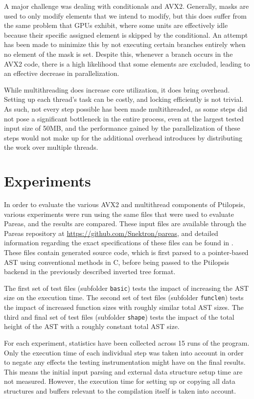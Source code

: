 \documentclass[11pt,dvipsnames]{article}
\newcommand{\mono}[1]{\texttt{#1}}
\newcommand{\Rplus}{\protect\hspace{-.1em}\protect\raisebox{.35ex}{\smaller{\smaller\textbf{+}}}}
\newcommand{\Cpp}{\mbox{C\Rplus\Rplus}\xspace}
\begin{document}
A major challenge was dealing with conditionals and AVX2. Generally, masks are used to only modify elements that we intend to modify, but this does suffer from the same problem that GPUs exhibit, where some units are effectively idle because their specific assigned element is skipped by the conditional. An attempt has been made to minimize this by not executing certain branches entirely when no element of the mask is set. Despite this, whenever a branch occurs in the AVX2 code, there is a high likelihood that some elements are excluded, leading to an effective decrease in parallelization.

While multithreading does increase core utilization, it does bring overhead. Setting up each thread's task can be costly, and locking efficiently is not trivial. As such, not every step possible has been made multithreaded, as some steps did not pose a significant bottleneck in the entire process, even at the largest tested input size of 50MB, and the performance gained by the parallelization of these steps would not make up for the additional overhead introduces by distributing the work over multiple threads.

\section{Experiments} \label{experiments}

In order to evaluate the various AVX2 and multithread components of Ptilopsis, various experiments were run using the same files that were used to evaluate Pareas, and the results are compared. These input files are available through the Pareas repository at \url{https://github.com/Snektron/pareas}, and detailed information regarding the exact specifications of these files can be found in \cite{huijben2021}. These files contain generated source code, which is first parsed to a pointer-based AST using conventional methods in \Cpp, before being passed to the Ptilopsis backend in the previously described inverted tree format.

The first set of test files (subfolder \mono{basic}) tests the impact of increasing the AST size on the execution time. The second set of test files (subfolder \mono{funclen}) tests the impact of increased function sizes with roughly similar total AST sizes. The third and final set of test files (subfolder \mono{shape}) tests the impact of the total height of the AST with a roughly constant total AST size.

For each experiment, statistics have been collected across 15 runs of the program. Only the execution time of each individual step was taken into account in order to negate any effects the testing instrumentation might have on the final results. This means the initial input parsing and external data structure setup time are not measured. However, the execution time for setting up or copying all data structures and buffers relevant to the compilation itself is taken into account.
\end{document}
